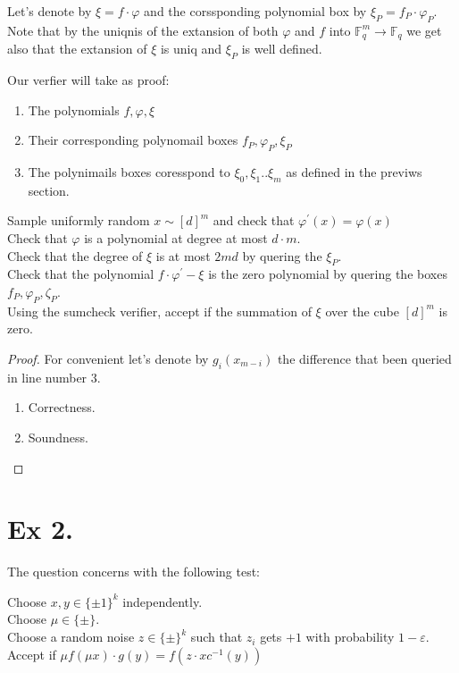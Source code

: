 \documentclass{article}
\newcommand{\FF}{\mathbb{F}_{q}}
\begin{document}
Let's denote by $\xi = f\cdot\varphi$ and the corssponding polynomial box by $\xi_{P} = f_{P} \cdot \varphi_{P}$. Note that by the uniqnis of the extansion of both $\varphi$ and $f$ into $\FF^{m}\rightarrow \FF$ we get also that the extansion of $\xi$ is uniq and $\xi_{P}$ is well defined.  

Our verfier will take as proof: 

\begin{enumerate}
  \item The polynomials $f,\varphi, \xi$ 
  \item Their corresponding polynomail boxes $f_{P},\varphi_{P}, \xi_{P}$ 
  \item The polynimails boxes coresspond to $\xi_{0}, \xi_{1} .. \xi_{m}$ as defined in the previws section.  
\end{enumerate}

\begin{algorithm}[H]
  Sample uniformly random $x \sim  [d]^{m}$ and check that $\varphi^{\prime}\left( x \right) = \varphi\left( x \right)$   \\
  Check that $\varphi$ is a polynomial at degree at most $d\cdot m$. \\
  Check that the degree of $\xi$ is at most $2md$ by quering the $\xi_{P}$.\\ 
  Check that the polynomial $f\cdot \varphi^{\prime} - \xi$ is the zero polynomial by quering the boxes $f_{P},\varphi_{P},\zeta_{P}$. \\
  Using the sumcheck verifier, accept if the summation of $\xi$ over the cube $[d]^{m}$ is zero.  
\end{algorithm}

\begin{proof} For convenient let's denote by $g_{i}\left( x_{m-i} \right)$ the difference that been queried in line number $3$. 
  \begin{enumerate}
    \item Correctness.
    \item Soundness.  
  \end{enumerate}
\end{proof}

\section{Ex 2.}
The question concerns with the following test: 

\begin{algorithm}[H]
  Choose $x,y \in \{\pm1\}^{k}$ independently. \\
  Choose $\mu \in \{\pm\}$. \\ 
  Choose a random noise $z \in \{\pm\}^{k}$ such that $z_{i}$ gets $+1$ with probability $1-\varepsilon$.  \\
  Accept if $\mu f\left( \mu x \right) \cdot g\left( y \right) = f\left(z \cdot x c^{-1}\left( y \right)  \right)$

\end{algorithm}
\end{document}
